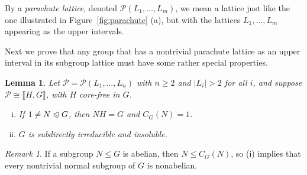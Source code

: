 \documentclass{gen-j-l}
\newcommand{\lb}{\ensuremath{\llbracket}}
\newcommand{\rb}{\ensuremath{\rrbracket}}
\newcommand{\<}{\ensuremath{\langle}}
\renewcommand{\>}{\ensuremath{\rangle}}
\theoremstyle{plain}
\newtheorem{lemma}[theorem]{Lemma}
\theoremstyle{definition}
\theoremstyle{remark}
\newtheorem*{remark}{Remark}
\numberwithin{theorem}{section}
\numberwithin{claim}{section}
\numberwithin{equation}{section}
\numberwithin{conjecture}{section}
\renewcommand{\leq}{\ensuremath{\leqslant}}
\renewcommand{\geq}{\ensuremath{\geqslant}}
\newcommand{\subnormal}{\ensuremath{\trianglelefteqslant}}
\newcommand{\2}{\ensuremath{\mathbf{2}}}
\newcommand{\3}{\ensuremath{\mathbf{3}}}
\newcommand{\sP}{\ensuremath{\mathscr{P}}}
\begin{document}
By a \emph{parachute lattice}, denoted $\sP(L_1, \dots, L_m)$,
we mean a lattice just like the one illustrated in 
Figure~\ref{fig:parachute} (a), but with the lattices $L_1, \dots, L_m$
appearing as the upper intervals. %

Next we prove that %
any group that has a nontrivial parachute lattice as an upper interval
in its subgroup lattice must have some rather special properties.  
\begin{lemma}
\label{lemma-wjd-5}
 Let $\sP = \sP(L_1, \dots, L_n)$ with $n\geq 2$ and $|L_i|>2$ for all
$i$, and suppose $\sP \cong \lb H, G \rb$, with $H$ core-free in $G$.  
\begin{enumerate}[(i)]
\item If $1\neq N \subnormal G$, then $NH = G$ and $C_G(N)=1$.
\item $G$ is subdirectly irreducible and insoluble.
\end{enumerate}
\end{lemma}
\begin{remark}
If a subgroup $N\leq G$ is abelian, then $N \leq C_G(N)$, so (i) implies
that every nontrivial normal subgroup of $G$ is nonabelian.  
\end{remark}
\end{document}
